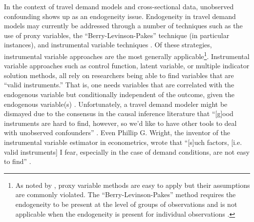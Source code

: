 In the context of travel demand models and cross-sectional data, unobserved confounding shows up as an endogeneity issue. Endogeneity in travel demand models may currently be addressed through a number of techniques such as the use of proxy variables, the ``Berry-Levinson-Pakes'' technique (in particular instances), and instrumental variable techniques \citep{guevara2015critical}. Of these strategies, instrumental variable approaches are the most generally applicable\footnote{As noted by \citet{guevara2015critical}, proxy variable methods are easy to apply but their assumptions are commonly violated. The ``Berry-Levinson-Pakes'' method requires the endogeneity to be present at the level of groups of observations and is not applicable when the endogeneity is present for individual observations \citep{guevara2015critical}.}. Instrumental variable approaches such as control function, latent variable, or multiple indicator solution methods, all rely on researchers being able to find variables that are ``valid instruments.'' That is, one needs variables that are correlated with the endogenous variable but conditionally independent of the outcome, given the endogenous variable(s) \citep{guevara2015critical}. Unfortunately, a travel demand modeler might be dismayed due to the consensus in the causal inference literature that ``[g]ood instruments are hard to find, however, so we'd like to have other tools to deal with unobserved confounders'' \citep{angrist2008mostly}. Even Phillip G. Wright, the inventor of the instrumental variable estimator in econometrics, wrote that ``[s]uch factors, [i.e. valid instruments] I fear, especially in the case of demand conditions, are not easy to find'' \citep{angrist2015mastering}.

